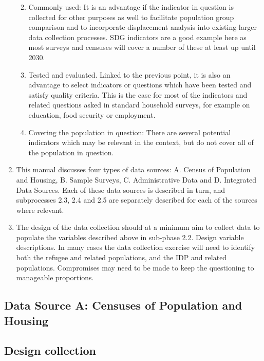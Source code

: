 \documentclass[
]{article}
\begin{document}
\begin{enumerate}
  \begin{enumerate}
  \def\labelenumii{\arabic{enumii}.}
  \setcounter{enumii}{5}
  \item
    Commonly used: It is an advantage if the indicator in question
    is collected for other purposes as well to facilitate population
    group comparison and to incorporate displacement analysis into
    existing larger data collection processes. SDG indicators are a
    good example here as most surveys and censuses will cover a
    number of these at least up until 2030.
  \item
    Tested and evaluated. Linked to the previous point, it is also
    an advantage to select indicators or questions which have been
    tested and satisfy quality criteria. This is the case for most
    of the indicators and related questions asked in standard
    household surveys, for example on education, food security or
    employment.
  \item
    Covering the population in question: There are several potential
    indicators which may be relevant in the context, but do not
    cover all of the population in question.
  \end{enumerate}
\item
  This manual discusses four types of data sources: A. Census of
  Population and Housing, B. Sample Surveys, C. Administrative Data
  and D. Integrated Data Sources. Each of these data sources is
  described in turn, and subprocesses 2.3, 2.4 and 2.5 are separately
  described for each of the sources where relevant.
\item
  The design of the data collection should at a minimum aim to collect
  data to populate the variables described above in sub-phase 2.2.
  Design variable descriptions. In many cases the data collection
  exercise will need to identify both the refugee and related
  populations, and the IDP and related populations. Compromises may
  need to be made to keep the questioning to manageable proportions.
\end{enumerate}

\hypertarget{data-source-a-censuses-of-population-and-housing-1}{%
\subsection{Data Source A: Censuses of Population and Housing}\label{data-source-a-censuses-of-population-and-housing-1}}

\hypertarget{design-collection-4}{%
\subsection{Design collection}\label{design-collection-4}}
\end{document}
